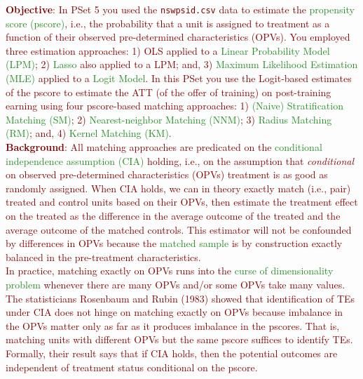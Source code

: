 \noindent \textcolor{Maroon}{\textbf{Objective}: In PSet 5 you used the \texttt{nswpsid.csv} data to estimate the \textcolor{ForestGreen}{propensity score (pscore)}, i.e., the probability that a unit is assigned to treatment as a function of their observed pre-determined characteristics (OPVs). You employed three estimation approaches: 1) OLS applied to a \textcolor{ForestGreen}{Linear Probability Model (LPM)}; 2) \textcolor{ForestGreen}{Lasso} also applied to a LPM; and, 3) \textcolor{ForestGreen}{Maximum Likelihood Estimation (MLE)} applied to a \textcolor{ForestGreen}{Logit Model}. In this PSet you use the Logit-based estimates of the pscore to estimate the ATT (of the offer of training) on post-training earning using four pscore-based matching approaches: 1) \textcolor{ForestGreen}{(Naive) Stratification Matching (SM)}; 2) \textcolor{ForestGreen}{Nearest-neighbor Matching (NNM)}; 3) \textcolor{ForestGreen}{Radius Matching (RM)}; and, 4) \textcolor{ForestGreen}{Kernel Matching (KM)}.} \\


\noindent \textcolor{Maroon}{\textbf{Background}: All matching approaches are predicated on the \textcolor{ForestGreen}{conditional independence assumption (CIA)} holding, i.e., on the assumption that \textit{conditional} on observed pre-determined characteristics (OPVs) treatment is as good as randomly assigned. When CIA holds, we can in theory exactly match (i.e., pair) treated and control units based on their OPVs, then estimate the treatment effect on the treated as the difference in the average outcome of the treated and the average outcome of the matched controls. This estimator will not be confounded by differences in OPVs because the \textcolor{ForestGreen}{matched sample} is by construction exactly balanced in the pre-treatment characteristics.} \\

\noindent \textcolor{Maroon}{In practice, matching exactly on OPVs runs into the \textcolor{ForestGreen}{curse of dimensionality problem} whenever there are many OPVs and/or some OPVs take many values. The statisticians Rosenbaum and Rubin (1983) showed that identification of TEs under CIA does not hinge on matching exactly on OPVs because imbalance in the OPVs matter only as far as it produces imbalance in the pscores. That is, matching units with different OPVs but the same pscore suffices to identify TEs. Formally, their result says that if CIA holds, then the potential outcomes are independent of treatment status conditional on the pscore.} \\

